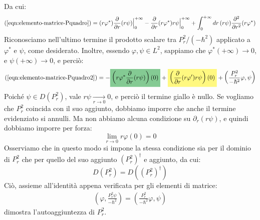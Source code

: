 \documentclass[../../FisicaTeorica.tex]{subfiles}
\begin{document}
Da cui:
\begin{align}
(\ref{eqn:elemento-matrice-Pquadro})=(r\varphi^*)\frac{\partial}{\partial r}(r\psi)\Big|_0^{+\infty} -\frac{\partial}{\partial r}(r\varphi^*)r\psi\Big|_0^{+\infty} + \int_0^{+\infty}dr\,(r\psi) \frac{\partial^2}{\partial r^2}(r\varphi^*)
\label{eqn:elemento-matrice-Pquadro2}
\end{align}
Riconosciamo nell'ultimo termine il prodotto scalare tra $P_r^2/(-\hbar^2)$ applicato a $\varphi^*$ e $\psi$, come desiderato. Inoltre, essendo $\varphi, \psi \in L^2$, sappiamo che $\varphi^*(+\infty)\to 0$, e $\psi(+\infty)\to 0$, e perciò:
\begin{align*}
(\ref{eqn:elemento-matrice-Pquadro2})=-\hlc{ForestGreen}{\left(r\varphi^*\frac{\partial}{\partial r}(r\psi)\right)(0)} +\hlc{Yellow}{ \left(\frac{\partial}{\partial r}(r\varphi')r\psi\right)(0)} + \left(\frac{P_r^2}{-\hbar^2}\varphi,\psi\right)
\end{align*}
Poiché $\psi \in D(P_r^2)$, vale $r\psi \xrightarrow[r\to0]{}0$, e perciò il termine giallo è nullo. Se vogliamo che $P_r^2$ coincida con il suo aggiunto, dobbiamo imporre che anche il termine evidenziato si annulli. Ma non abbiamo alcuna condizione su $\partial_r(r\psi)$, e quindi dobbiamo imporre per forza:
\[
\lim_{r \to 0} r\varphi(0) = 0
\]
Osserviamo che in questo modo si impone la stessa condizione sia per il dominio di $P_r^2$ che per quello del suo aggiunto $(P_r^2)^\dag$ e aggiunto, da cui:
\[
D(P_r^2) = D((P_r^2)^\dag)
\]
Ciò, assieme all'identità appena verificata per gli elementi di matrice:
\begin{align*}
\left(\varphi, \frac{P_r^2 \psi}{-\hbar^2}\right)=\left(\frac{P_r^2}{-\hbar^2}\varphi,\psi\right)
\end{align*}
dimostra l'autoaggiuntezza di $P_r^2$.\\
\end{document}

